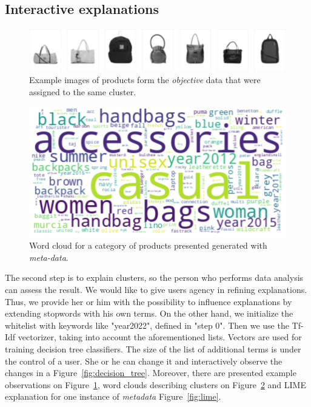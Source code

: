 \documentclass[
 twocolumn,
 hf,
]{ceurart}
\begin{document}
\subsection{Interactive explanations}\label{subsec:interactive-explanations}
\begin{figure}[h!]
  \centering
  \includegraphics[width=\linewidth]{example1-clustering-products-fashion-tex/output_62_22}
  \caption{Example images of products form the \textit{objective} data that were assigned to the same cluster.}
  \label{fig:example_products}
\end{figure}

\begin{figure}[h!]
  \centering
  \includegraphics[width=\linewidth]{example1-clustering-products-fashion-tex/output_62_23}
  \caption{Word cloud for a category of products presented generated with \textit{meta-data}.}
  \label{fig:wordcloud}
\end{figure}

The second step is to explain clusters, so the person who performs data analysis can assess the result.
We would like to give users agency in refining explanations.
Thus, we provide her or him with the possibility to influence explanations by extending stopwords with his own terms.
On the other hand, we initialize the whitelist with keywords like "year2022", defined in "step 0".
Then we use the Tf-Idf vectorizer, taking into account the aforementioned lists.
Vectors are used for training decision tree classifiers.
The size of the list of additional terms is under the control of a user.
She or he can change it and interactively observe the changes in a Figure~\ref{fig:decision_tree}.
Moreover, there are presented example observations on Figure~\ref{fig:example_products}, word clouds describing clusters on Figure~\ref{fig:wordcloud} and LIME~\cite{lime} explanation for one instance of \textit{metadata} Figure~\ref{fig:lime}.
\end{document}
